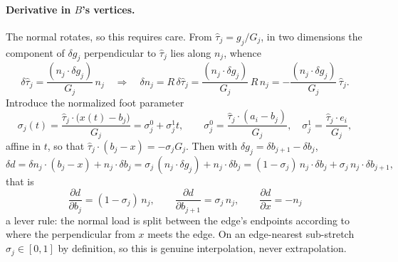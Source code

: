 \documentclass[11pt]{article}
\newcommand{\tauh}{\hat\tau}
\begin{document}
\paragraph{Derivative in $B$'s vertices.} The normal rotates, so this requires care. From $\tauh_j = g_j/G_j$, in two dimensions the component of $\delta g_j$ perpendicular to $\tauh_j$ lies along $n_j$, whence
\begin{equation}
\delta\tauh_j = \frac{(n_j\cdot\delta g_j)}{G_j}\,n_j
\quad\Longrightarrow\quad
\delta n_j = R\,\delta\tauh_j = \frac{(n_j\cdot\delta g_j)}{G_j}\,R\,n_j
= -\frac{(n_j\cdot\delta g_j)}{G_j}\,\tauh_j .
\label{eq:dn}
\end{equation}
Introduce the normalized foot parameter
\begin{equation}
\sigma_j(t) = \frac{\tauh_j\cdot\big(x(t)-b_j\big)}{G_j} = \sigma^0_j + \sigma^1_j t,
\qquad \sigma^0_j = \frac{\tauh_j\cdot(a_i-b_j)}{G_j}, \quad \sigma^1_j = \frac{\tauh_j\cdot e_i}{G_j},
\label{eq:sigma}
\end{equation}
affine in $t$, so that $\tauh_j\cdot(b_j-x) = -\sigma_jG_j$. Then with $\delta g_j = \delta b_{j+1}-\delta b_j$,
\begin{equation}
\delta d = \delta n_j\cdot(b_j-x) + n_j\cdot\delta b_j
= \sigma_j\,(n_j\cdot\delta g_j) + n_j\cdot\delta b_j
= (1-\sigma_j)\,n_j\cdot\delta b_j + \sigma_j\,n_j\cdot\delta b_{j+1},
\end{equation}
that is
\begin{equation}
\boxed{\;\frac{\partial d}{\partial b_j} = (1-\sigma_j)\,n_j, \qquad
\frac{\partial d}{\partial b_{j+1}} = \sigma_j\,n_j, \qquad
\frac{\partial d}{\partial x} = -n_j\;}
\label{eq:lever}
\end{equation}
a lever rule: the normal load is split between the edge's endpoints according to where the perpendicular from $x$ meets the edge. On an edge-nearest sub-stretch $\sigma_j\in[0,1]$ by definition, so this is genuine interpolation, never extrapolation.
\end{document}
